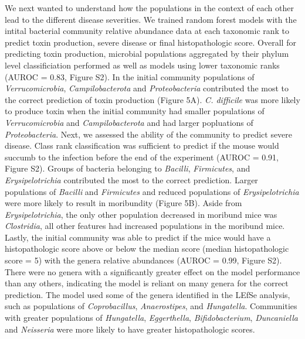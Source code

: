 \documentclass[
  12pt,
]{article}
\begin{document}
We next wanted to understand how the populations in the context of each
other lead to the different disease severities. We trained random forest
models with the intital bacterial community relative abundance data at
each taxonomic rank to predict toxin production, severe disease or final
histopathologic score. Overall for predicting toxin production,
microbial populations aggregated by their phylum level classificiation
performed as well as models using lower taxonomic ranks (AUROC = 0.83,
Figure S2). In the initial community populations of
\emph{Verrucomicrobia}, \emph{Campilobacterota} and
\emph{Proteobacteria} contributed the most to the correct prediction of
toxin production (Figure 5A). \emph{C. difficile} was more likely to
produce toxin when the initial community had smaller populations of
\emph{Verrucomicrobia} and \emph{Campilobacterota} and had larger
popluations of \emph{Proteobacteria}. Next, we assessed the ability of
the community to predict severe disease. Class rank classification was
sufficient to predict if the mouse would succumb to the infection before
the end of the experiment (AUROC = 0.91, Figure S2). Groups of bacteria
belonging to \emph{Bacilli}, \emph{Firmicutes}, and
\emph{Erysipelotrichia} contributed the most to the correct prediction.
Larger populations of \emph{Bacilli} and \emph{Firmicutes} and reduced
populations of \emph{Erysipelotrichia} were more likely to result in
moribundity (Figure 5B). Aside from \emph{Erysipelotrichia}, the only
other population decreased in moribund mice was \emph{Clostridia}, all
other features had increased populations in the moribund mice. Lastly,
the initial community was able to predict if the mice would have a
histopathologic score above or below the median score (median
histopathologic score = 5) with the genera relative abundances (AUROC =
0.99, Figure S2). There were no genera with a significantly greater
effect on the model performance than any others, indicating the model is
reliant on many genera for the correct prediction. The model used some
of the genera identified in the LEfSe analysis, such as populations of
\emph{Coprobacillus}, \emph{Anaerostipes}, and \emph{Hungatella}.
Communities with greater populations of \emph{Hungatella},
\emph{Eggerthella}, \emph{Bifidobacterium}, \emph{Duncaniella} and
\emph{Neisseria} were more likely to have greater histopathologic
scores.
\end{document}
